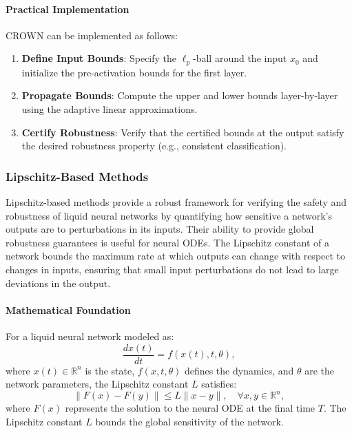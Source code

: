 \paragraph{Practical Implementation}
CROWN can be implemented as follows:
\begin{enumerate}
    \item \textbf{Define Input Bounds}: Specify the \(\ell_p\)-ball around the input \(x_0\) and initialize the pre-activation bounds for the first layer.
    \item \textbf{Propagate Bounds}: Compute the upper and lower bounds layer-by-layer using the adaptive linear approximations.
    \item \textbf{Certify Robustness}: Verify that the certified bounds at the output satisfy the desired robustness property (e.g., consistent classification).
\end{enumerate}
\cite{zhangEfficientNeuralNetwork2018}

\subsubsection{Lipschitz-Based Methods}

Lipschitz-based methods provide a robust framework for verifying the safety and robustness of liquid neural networks by quantifying how sensitive a network's outputs are to perturbations in its inputs. Their ability to provide global robustness guarantees is useful for neural ODEs. The Lipschitz constant of a network bounds the maximum rate at which outputs can change with respect to changes in inputs, ensuring that small input perturbations do not lead to large deviations in the output.

\paragraph{Mathematical Foundation}
For a liquid neural network modeled as:
\[
\frac{dx(t)}{dt} = f(x(t), t, \theta),
\]
where \(x(t) \in \mathbb{R}^n\) is the state, \(f(x, t, \theta)\) defines the dynamics, and \(\theta\) are the network parameters, the Lipschitz constant \(L\) satisfies:
\[
\|F(x) - F(y)\| \leq L \|x - y\|, \quad \forall x, y \in \mathbb{R}^n,
\]
where \(F(x)\) represents the solution to the neural ODE at the final time \(T\). The Lipschitz constant \(L\) bounds the global sensitivity of the network.

